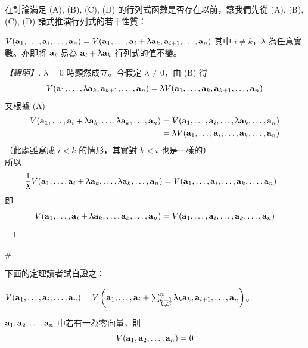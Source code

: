 在討論滿足 (A), (B), (C), (D) 的行列式函數是否存在以前，讓我們先從 (A), (B), (C), (D) 諸式推演行列式的若干性質：

\begin{theorem}\label{thm:b6-1-2}
$V(\vect{a}_1, \dots, \vect{a}_i, \dots, \vect{a}_n) = V(\vect{a}_1, \dots, \vect{a}_i + \lambda\vect{a}_k, \vect{a}_{i+1}, \dots, \vect{a}_n)$ 其中 $i \ne k$，$\lambda$ 為任意實數。亦即將 $\vect{a}_i$ 易為 $\vect{a}_i + \lambda\vect{a}_k$ 行列式的值不變。
\end{theorem}

\begin{proof}[【證明】]
$\lambda=0$ 時顯然成立。今假定 $\lambda \ne 0$，由 (B) 得
\[ V(\vect{a}_1, \dots, \lambda\vect{a}_k, \vect{a}_{k+1}, \dots, \vect{a}_n) = \lambda V(\vect{a}_1, \dots, \vect{a}_k, \vect{a}_{k+1}, \dots, \vect{a}_n) \]
又根據 (A)
\begin{align*}
V(\vect{a}_1, \dots, \vect{a}_i + \lambda\vect{a}_k, \dots, \lambda\vect{a}_k, \dots, \vect{a}_n) &= V(\vect{a}_1, \dots, \vect{a}_i, \dots, \lambda\vect{a}_k, \dots, \vect{a}_n) \\
&= \lambda V(\vect{a}_1, \dots, \vect{a}_i, \dots, \vect{a}_k, \dots, \vect{a}_n)
\end{align*}
（此處雖寫成 $i < k$ 的情形，其實對 $k < i$ 也是一樣的）\\
所以
\begin{align*}
\dfrac{1}{\lambda} V(\vect{a}_1, \dots, \vect{a}_i + \lambda\vect{a}_k, \dots, \lambda\vect{a}_k, \dots, \vect{a}_n) &= V(\vect{a}_1, \dots, \vect{a}_i, \dots, \vect{a}_k, \dots, \vect{a}_n)
\end{align*}
即
\[ V(\vect{a}_1, \dots, \vect{a}_i + \lambda\vect{a}_k, \dots, \vect{a}_k, \dots, \vect{a}_n) = V(\vect{a}_1, \dots, \vect{a}_i, \dots, \vect{a}_k, \dots, \vect{a}_n) \]
\end{proof}\hfill$\#$

下面的定理讀者試自證之：

\begin{theorem}\label{thm:b6-1-3}
$V(\vect{a}_1, \dots, \vect{a}_i, \dots, \vect{a}_n) = V\left(\vect{a}_1, \dots, \vect{a}_i + \sum_{\substack{k=1\\ k\ne i}}^n \lambda_k \vect{a}_k, \vect{a}_{i+1}, \dots, \vect{a}_n\right)$。
\end{theorem}

\begin{theorem}\label{thm:b6-1-4}
$\vect{a}_1, \vect{a}_2, \dots, \vect{a}_n$ 中若有一為零向量，則
\[ V(\vect{a}_1, \vect{a}_2, \dots, \vect{a}_n) = 0 \]
\end{theorem}

